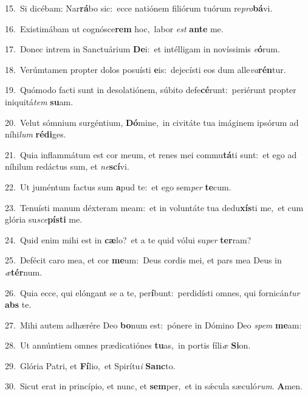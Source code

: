 {\numbfont\textcolor{\numbcolor}{15.}}~Si dicébam: Nar\-\textbf{rá}\-bo sic:~\star ecce natiónem filiórum tuórum re\-\textit{pro}\-\textbf{bá}vi.\par
{\numbfont\textcolor{\numbcolor}{16.}}~Existimábam ut cognósce\textbf{rem} hoc,~\star labor \textit{est} \textbf{an}\-\textbf{te} me.\par
{\numbfont\textcolor{\numbcolor}{17.}}~Donec intrem in Sanctuárium \textbf{De}\-i:~\star et intélligam in novíssimis \textit{e}\-\textbf{ó}rum.\par
{\numbfont\textcolor{\numbcolor}{18.}}~Verúmtamen propter dolos posuísti \textbf{e}\-is:~\star dejecísti eos dum alle\-\textit{va}\-\textbf{rén}tur.\par
{\numbfont\textcolor{\numbcolor}{19.}}~Quómodo facti sunt in desolatiónem, súbito defe\-\textbf{cé}\-runt:~\star periérunt propter iniquitá\textit{tem} \textbf{su}\-am.\par
{\numbfont\textcolor{\numbcolor}{20.}}~Velut sómnium surgéntium, \textbf{Dó}\-mine,~\star in civitáte tua imáginem ipsórum ad níhi\textit{lum} \textbf{réd}\-\textbf{i}ges.\par
{\numbfont\textcolor{\numbcolor}{21.}}~Quia inflammátum est cor meum, et renes mei commu\-\textbf{tá}\-ti sunt:~\star et ego ad níhilum redáctus sum, et \textit{ne}\-\textbf{scí}vi.\par
{\numbfont\textcolor{\numbcolor}{22.}}~Ut juméntum factus sum \textbf{a}\-pud te:~\star et ego sem\textit{per} \textbf{te}\-cum.\par
{\numbfont\textcolor{\numbcolor}{23.}}~Tenuísti manum déxteram meam:~\dagger et in voluntáte tua dedu\-\textbf{xís}\-ti me,~\star et cum glória su\-\textit{sce}\-\textbf{pís}\textbf{ti} me.\par
{\numbfont\textcolor{\numbcolor}{24.}}~Quid enim mihi est in \textbf{cæ}\-lo?~\star et a te quid vólui su\textit{per} \textbf{ter}\-ram?\par
{\numbfont\textcolor{\numbcolor}{25.}}~Defécit caro mea, et cor \textbf{me}\-um:~\star Deus cordis mei, et pars mea Deus in \textit{æ}\-\textbf{tér}num.\par
{\numbfont\textcolor{\numbcolor}{26.}}~Quia ecce, qui elóngant se a te, per\-\textbf{í}\-bunt:~\star perdidísti omnes, qui fornicán\textit{tur} \textbf{abs} te.\par
{\numbfont\textcolor{\numbcolor}{27.}}~Mihi autem adhærére Deo \textbf{bo}\-num est:~\star pónere in Dómino Deo \textit{spem} \textbf{me}\-am:\par
{\numbfont\textcolor{\numbcolor}{28.}}~Ut annúntiem omnes prædicatiónes \textbf{tu}\-as,~\star in portis fíli\textit{æ} \textbf{Si}\-on.\par
{\numbfont\textcolor{\numbcolor}{29.}}~Glória Patri, et \textbf{Fí}\-lio,~\star et Spirítu\textit{i} \textbf{Sanc}\-to.\par
{\numbfont\textcolor{\numbcolor}{30.}}~Sicut erat in princípio, et nunc, et \textbf{sem}\-per,~\star et in sǽcula sæculó\-\textit{rum}\-. \textbf{A}\-men.\par
